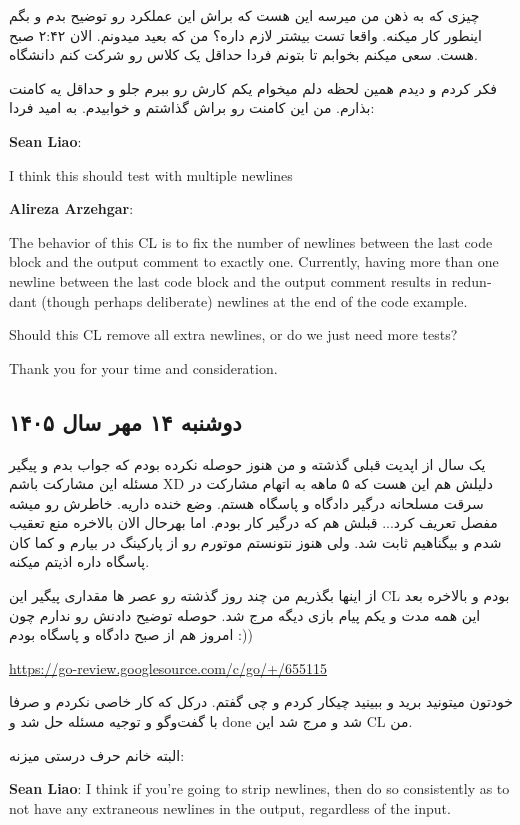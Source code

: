 چیزی که به ذهن من میرسه این هست که براش این عملکرد رو توضیح بدم و بگم اینطور کار میکنه. واقعا تست بیشتر لازم داره؟
من که بعید میدونم. الان ۲:۴۲ صبح هست. سعی میکنم بخوابم تا بتونم فردا حداقل یک کلاس رو شرکت کنم دانشگاه.

فکر کردم و دیدم همین لحظه دلم میخوام یکم کارش رو ببرم جلو و حداقل یه کامنت بذارم. من این کامنت رو براش گذاشتم و خوابیدم. به امید فردا:

\begin{latin}
\textbf{Sean Liao}:

I think this should test with multiple newlines

\textbf{Alireza Arzehgar}:

The behavior of this CL is to fix the number of newlines between the last code block and the output comment to exactly one. Currently, having more than one newline between the last code block and the output comment results in redundant (though perhaps deliberate) newlines at the end of the code example.

Should this CL remove all extra newlines, or do we just need more tests?

Thank you for your time and consideration.
\end{latin}

\subsection{دوشنبه ۱۴ مهر سال ۱۴۰۵}

یک سال از اپدیت قبلی گذشته و من هنوز حوصله نکرده بودم که جواب بدم و پیگیر مسئله این مشارکت باشم XD
دلیلش هم این هست که ۵ ماهه به اتهام مشارکت در سرقت مسلحانه درگیر دادگاه و پاسگاه هستم. وضع خنده داریه. خاطرش رو میشه مفصل تعریف کرد...
قبلش هم که درگیر کار بودم. اما بهرحال الان بالاخره منع تعقیب شدم و بیگناهیم ثابت شد. ولی هنوز نتونستم موتورم رو از پارکینگ در بیارم و کما کان پاسگاه داره اذیتم میکنه.

از اینها بگذریم من چند روز گذشته رو عصر ها مقداری پیگیر این CL بودم و بالاخره بعد این همه مدت و یکم پیام بازی دیگه مرج شد. حوصله توضیح دادنش رو ندارم
چون امروز هم از صبح دادگاه و پاسگاه بودم :))

\url{https://go-review.googlesource.com/c/go/+/655115}

خودتون میتونید برید و ببینید چیکار کردم و چی گفتم. درکل که کار خاصی نکردم و صرفا با گفت‌وگو و توجیه مسئله حل شد و done شد و مرج شد این CL من.

البته خانم  حرف درستی میزنه:
\begin{latin}
\textbf{Sean Liao}:
I think if you're going to strip newlines, then do so consistently as to not have
any extraneous newlines in the output, regardless of the input.
\end{latin}

